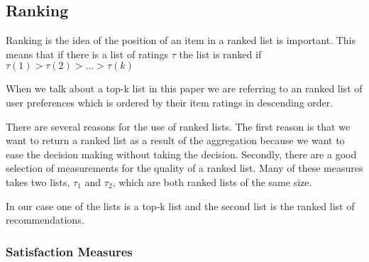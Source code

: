\subsection{Ranking}
Ranking is the idea of the position of an item in a ranked list is important. This means that if there is a list of ratings $\tau$ the list is ranked if $\tau (1) > \tau (2) > ... > \tau (k)$

When we talk about a top-k list in this paper we are referring to an ranked list of user preferences which is ordered by their item ratings in descending order.

There are several reasons for the use of ranked lists. 
The first reason is that we want to return a ranked list as a result of the aggregation because we want to ease the decision making without taking the decision. 
Secondly, there are a good selection of measurements for the quality of a ranked list. Many of these measures takes two lists, $\tau_1$ and $\tau_2$, which are both ranked lists of the same size. 

In our case one of the lists is a top-k list and the second list is the ranked list of recommendations.

\subsubsection{Satisfaction Measures}


